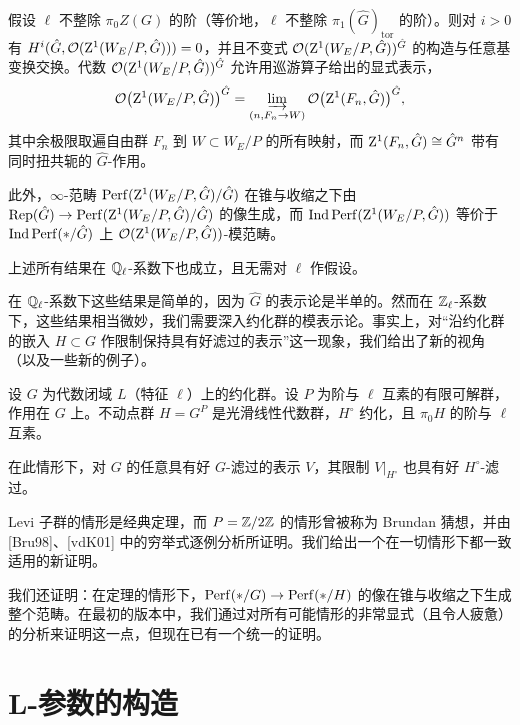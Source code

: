 \begin{theorem}%
假设 $\ell$ 不整除 $\pi_0Z(G)$ 的阶（等价地，$\ell$ 不整除 $\pi_1(\hat G)_{\mathrm{tor}}$ 的阶）。则对 $i>0$ 有 $H^i(\hat G,\mathcal{O}(\mathrm{Z}^1(W_E/P,\hat G)))=0$，并且不变式 $\mathcal{O}(\mathrm{Z}^1(W_E/P,\hat G))^{\hat G}$ 的构造与任意基变换交换。代数 $\mathcal{O}(\mathrm{Z}^1(W_E/P,\hat G))^{\hat G}$ 允许用巡游算子给出的显式表示，
\[
\mathcal{O}\bigl(\mathrm{Z}^1(W_E/P,\hat G)\bigr)^{\hat G}=\varinjlim_{(n,F_n\to W)}\mathcal{O}\bigl(\mathrm{Z}^1(F_n,\hat G)\bigr)^{\hat G},
\]
其中余极限取遍自由群 $F_n$ 到 $W\subset W_E/P$ 的所有映射，而 $\mathrm{Z}^1(F_n,\hat G)\cong\hat G^n$ 带有同时扭共轭的 $\hat G$-作用。

此外，$\infty$-范畴 $\operatorname{Perf}(\mathrm{Z}^1(W_E/P,\hat G)/\hat G)$ 在锥与收缩之下由 $\mathrm{Rep}(\hat G)\to\operatorname{Perf}(\mathrm{Z}^1(W_E/P,\hat G)/\hat G)$ 的像生成，而 $\operatorname{Ind}\operatorname{Perf}(\mathrm{Z}^1(W_E/P,\hat G))$ 等价于 $\operatorname{Ind}\operatorname{Perf}(*/\hat G)$ 上 $\mathcal{O}(\mathrm{Z}^1(W_E/P,\hat G))$-模范畴。
\end{theorem}

上述所有结果在 $\mathbb{Q}_\ell$-系数下也成立，且无需对 $\ell$ 作假设。

在 $\mathbb{Q}_\ell$-系数下这些结果是简单的，因为 $\hat G$ 的表示论是半单的。然而在 $\mathbb{Z}_\ell$-系数下，这些结果相当微妙，我们需要深入约化群的模表示论。事实上，对“沿约化群的嵌入 $H\subset G$ 作限制保持具有好滤过的表示”这一现象，我们给出了新的视角（以及一些新的例子）。

\begin{theorem}%
设 $G$ 为代数闭域 $L$（特征 $\ell$）上的约化群。设 $P$ 为阶与 $\ell$ 互素的有限可解群，作用在 $G$ 上。不动点群 $H=G^P$ 是光滑线性代数群，$H^\circ$ 约化，且 $\pi_0H$ 的阶与 $\ell$ 互素。

在此情形下，对 $G$ 的任意具有好 $G$-滤过的表示 $V$，其限制 $V|_{H^\circ}$ 也具有好 $H^\circ$-滤过。
\end{theorem}

Levi 子群的情形是经典定理，而 $P=\mathbb{Z}/2\mathbb{Z}$ 的情形曾被称为 Brundan 猜想，并由 [Bru98]、[vdK01] 中的穷举式逐例分析所证明。我们给出一个在一切情形下都一致适用的新证明。

我们还证明：在定理的情形下，$\operatorname{Perf}(*/G)\to\operatorname{Perf}(*/H)$ 的像在锥与收缩之下生成整个范畴。在最初的版本中，我们通过对所有可能情形的非常显式（且令人疲惫）的分析来证明这一点，但现在已有一个统一的证明。

\section{L-参数的构造}


